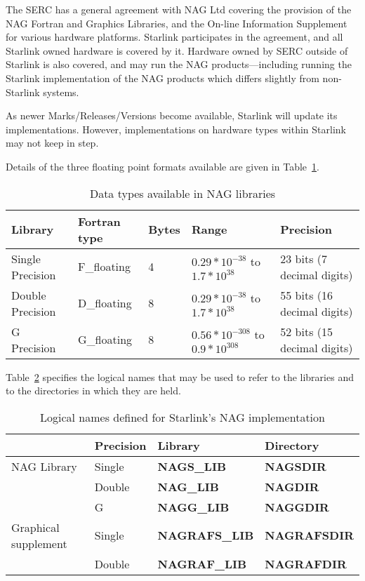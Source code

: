 The SERC has a general agreement with NAG Ltd covering the provision of the
NAG Fortran and Graphics Libraries, and the On-line Information Supplement for
various hardware platforms. Starlink participates in the agreement, and all
Starlink owned hardware is covered by it. Hardware owned by SERC outside of
Starlink is also covered, and may run the NAG products---including running the
Starlink implementation of the NAG products which differs slightly from
non-Starlink systems.  

As newer Marks/Releases/Versions become available, Starlink will update its
implementations. However, implementations on hardware types within Starlink may
not keep in step.

Details of the three floating point formats available are given in
Table~\ref{tab:types}.

\begin{small}
\begin{table}[h]
\begin{center}
\begin{tabular}{|l|l|l|l|l|}
\hline
Library & Fortran type & Bytes & Range & Precision \\
\hline
Single Precision & F\_floating & 4 & $0.29 * 10^{-38}$ to $1.7 * 10^{38}$ &
 23 bits (7 decimal digits) \\
Double Precision & D\_floating & 8 & $0.29 * 10^{-38}$ to $1.7 * 10^{38}$ &
 55 bits (16 decimal digits) \\
G Precision & G\_floating & 8 & $0.56 * 10^{-308}$ to $0.9 * 10^{308}$ &
 52 bits (15 decimal digits) \\
\hline
\end{tabular}
\caption{Data types available in NAG libraries}
\label{tab:types}
\end{center}
\end{table}
\end{small}

Table~\ref{tab:logs} specifies the logical names that may be used to refer
to the libraries and to the directories in which they are held.

\begin{table}
\begin{center}
\begin{tabular}{|l|l|l|l|}
\hline
                     & Precision & Library            & Directory        \\
\hline
NAG Library          & Single    & {\bf NAGS\_LIB}    & {\bf NAGSDIR}    \\
                     & Double    & {\bf NAG\_LIB}     & {\bf NAGDIR}     \\
                     & G         & {\bf NAGG\_LIB}    & {\bf NAGGDIR}    \\
\hline
Graphical supplement & Single    & {\bf NAGRAFS\_LIB} & {\bf NAGRAFSDIR} \\
                     & Double    & {\bf NAGRAF\_LIB}  & {\bf NAGRAFDIR}  \\
\hline
\end{tabular}
\caption{Logical names defined for Starlink's NAG implementation}
\label{tab:logs}
\end{center}
\end{table}

